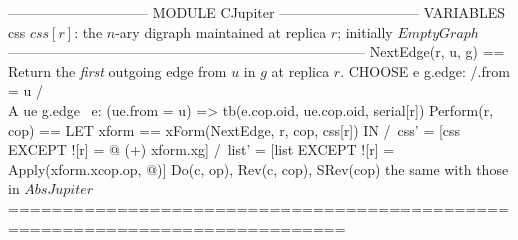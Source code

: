 \documentclass{article}
\begin{document}
\begin{tla}
------------------------------ MODULE CJupiter ------------------------------
VARIABLES css  \* $css[r]$: the $n$-ary digraph maintained at replica $r$; initially $EmptyGraph$
-----------------------------------------------------------------------------
NextEdge(r, u, g) == \* Return the \emph{first} outgoing edge from $u$ in $g$ at replica $r$. 
    CHOOSE e \in g.edge:
        /\e.from = u 
        /\\A ue \in g.edge \ {e}: (ue.from = u) => tb(e.cop.oid, ue.cop.oid, serial[r])
Perform(r, cop) == LET xform == xForm(NextEdge, r, cop, css[r])
                   IN  /\ css' = [css EXCEPT ![r] = @ (+) xform.xg]
                       /\ list' = [list EXCEPT ![r] = Apply(xform.xcop.op, @)]
Do(c, op),  Rev(c, cop),  SRev(cop) \* the same with those in $AbsJupiter$
=============================================================================
\end{tla}
\end{document}
